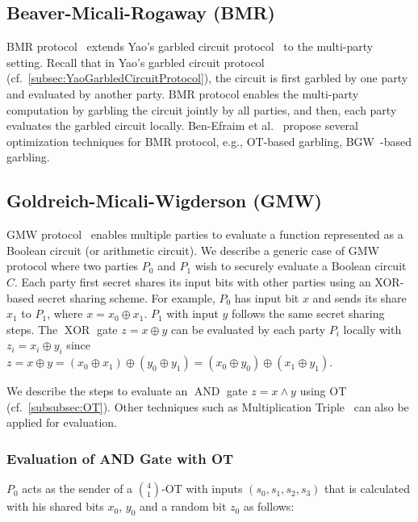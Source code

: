 \subsection{Beaver-Micali-Rogaway (BMR)}
\label{subsec:BMR}
BMR protocol~\cite{beaver1990round} extends Yao's garbled circuit protocol~\cite{Yao86} to the multi-party setting. Recall that in Yao's garbled circuit protocol (cf.~\autoref{subsec:YaoGarbledCircuitProtocol}), the circuit is first garbled by one party and evaluated by another party. BMR protocol enables the multi-party computation by garbling the circuit jointly by all parties, and then, each party evaluates the garbled circuit locally. Ben-Efraim et al.~\cite{ben2016optimizing} propose several optimization techniques for BMR protocol, e.g., OT-based garbling, BGW~\cite{wigderson1988completeness}-based garbling.


\subsection{Goldreich-Micali-Wigderson (GMW)}
\label{subsec:GMW}
GMW protocol~\cite{goldwasser1987play} enables multiple parties to evaluate a function represented as a Boolean circuit (or arithmetic circuit).
We describe a generic case of GMW protocol where two parties $P_0$ and $P_1$ wish to securely evaluate a Boolean circuit $C$.
Each party first secret shares its input bits with other parties using an XOR-based secret sharing scheme. For example, $P_{0}$ has input bit $x$ and sends its share $x_{1} $ to $P_1$, where $x=x_0 \oplus x_1$. $P_1$ with input $y$ follows the same secret sharing steps.
The $\operatorname{XOR}$ gate $z=x\oplus y$ can be evaluated by each party $P_i$ locally with $z_i= x_i \oplus y_i$ since $z= x\oplus y = \left(x_0 \oplus x_1\right) \oplus \left(y_0 \oplus y_1\right) =\left(x_0 \oplus y_0\right) \oplus \left(x_1 \oplus y_1\right)$.

We describe the steps to evaluate an $\operatorname{AND}$ gate $z=x \land y$ using OT (cf.~\autoref{subsubsec:OT}).
Other techniques such as Multiplication Triple~\cite{beaver1991efficient} can also be applied for evaluation.

\subsubsection{Evaluation of AND Gate with OT~\cite{choi2012secure, zohner2017faster}}
$P_0$ acts as the sender of a $\binom{4}{1} $-OT with inputs $\left(s_0,s_1,s_2,s_3\right) $ that is calculated with his shared bits $x_0$, $y_0$ and a random bit $z_0$ as follows:

